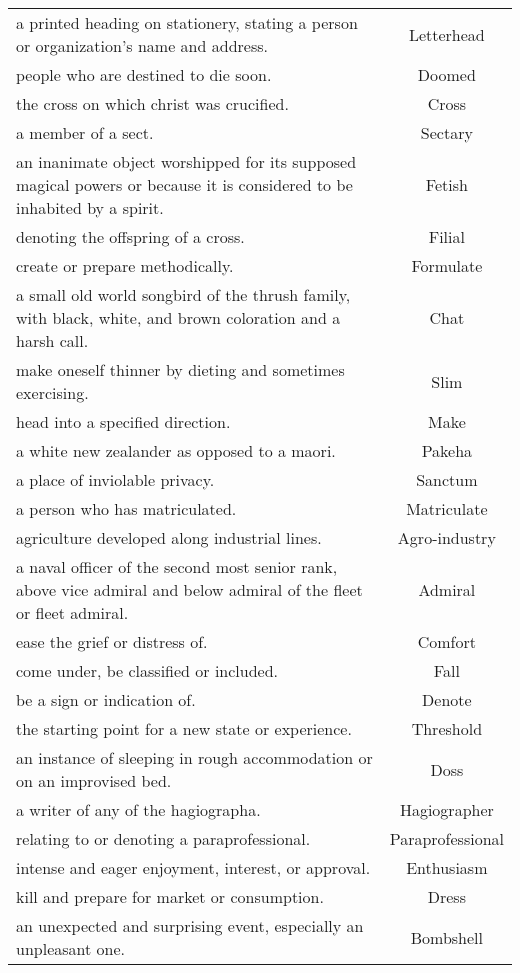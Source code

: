 \documentclass{article}
\begin{document}
\begin{longtable}{p{12cm}c}
a printed heading on stationery, stating a person or organization's name and address. & Letterhead\\
people who are destined to die soon. & Doomed\\
the cross on which christ was crucified. & Cross\\
a member of a sect. & Sectary\\
an inanimate object worshipped for its supposed magical powers or because it is considered to be inhabited by a spirit. & Fetish\\
denoting the offspring of a cross. & Filial\\
create or prepare methodically. & Formulate\\
a small old world songbird of the thrush family, with black, white, and brown coloration and a harsh call. & Chat\\
make oneself thinner by dieting and sometimes exercising. & Slim\\
head into a specified direction. & Make\\
a white new zealander as opposed to a maori. & Pakeha\\
a place of inviolable privacy. & Sanctum\\
a person who has matriculated. & Matriculate\\
agriculture developed along industrial lines. & Agro-industry\\
a naval officer of the second most senior rank, above vice admiral and below admiral of the fleet or fleet admiral. & Admiral\\
ease the grief or distress of. & Comfort\\
come under, be classified or included. & Fall\\
be a sign or indication of. & Denote\\
the starting point for a new state or experience. & Threshold\\
an instance of sleeping in rough accommodation or on an improvised bed. & Doss\\
a writer of any of the hagiographa. & Hagiographer\\
relating to or denoting a paraprofessional. & Paraprofessional\\
intense and eager enjoyment, interest, or approval. & Enthusiasm\\
kill and prepare for market or consumption. & Dress\\
an unexpected and surprising event, especially an unpleasant one. & Bombshell\\

\end{longtable}
\end{document}
